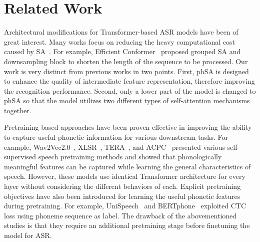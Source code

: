 \section{Related Work}\label{sec:related}

Architectural modifications for Transformer-based ASR models have been of great interest.
Many works focus on reducing the heavy computational cost caused by SA~\cite{efficient-conformer, sparse-conformer, simplified-sa, synthesizer}.
For example, Efficient Conformer~\cite{efficient-conformer} proposed grouped SA and downsampling block to shorten the length of the sequence to be processed.
Our work is very distinct from previous works in two points.
First, phSA is designed to enhance the quality of intermediate feature representation, therefore improving the recognition performance.
Second, only a lower part of the model is changed to phSA so that the model utilizes two different types of self-attention mechanisms together.

Pretraining-based approaches have been proven effective in improving the ability to capture useful phonetic information for various downstream tasks.
For example, Wav2Vec2.0~\cite{wav2vec2}, XLSR~\cite{xlsr}, TERA~\cite{tera}, and ACPC~\cite{acpc} presented various self-supervised speech pretraining methods and showed that phonologically meaningful features can be captured while learning the general characteristics of speech.
However, these models use identical Transformer architecture for every layer without considering the different behaviors of each.
Explicit pretraining objectives have also been introduced for learning the useful phonetic features during pretraining.
For example, UniSpeech~\cite{unispeech} and BERTphone~\cite{ling2020bertphone} exploited CTC loss using phoneme sequence as label.
The drawback of the abovementioned studies is that they require an additional pretraining stage before finetuning the model for ASR.
